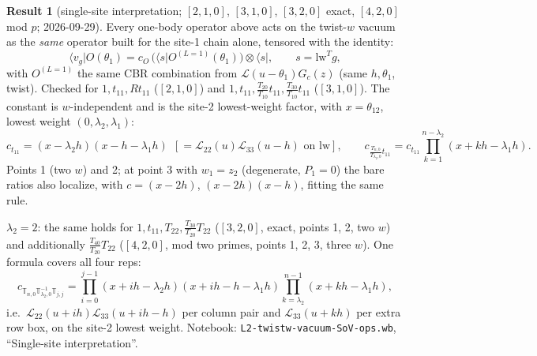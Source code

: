 \documentclass[11pt]{article}
\newcommand{\nb}[1]{\texttt{#1}}
\theoremstyle{definition}
\newtheorem{result}{Result}
\theoremstyle{remark}
\begin{document}
\begin{result}[{single-site interpretation; $[2,1,0]$, $[3,1,0]$, $[3,2,0]$ exact, $[4,2,0]$ mod $p$; 2026-09-29}]
Every one-body operator above acts on the twist-$w$ vacuum as the \emph{same} operator built for the site-1 chain alone, tensored with the identity:
\[
\langle v_g|O(\theta_1)=c_O\,\big(\langle s|O^{(L=1)}(\theta_1)\big)\otimes\langle s|,\qquad s=\mathrm{lw}^Tg,
\]
with $O^{(L=1)}$ the same CBR combination from $\mathcal L(u-\theta_1)G_c(z)$ (same $h,\theta_1$, twist). Checked for $1,t_{11},Rt_{11}$ ($[2,1,0]$) and $1,t_{11},\tfrac{T_{20}}{T_{10}}t_{11},\tfrac{T_{30}}{T_{10}}t_{11}$ ($[3,1,0]$). The constant is $w$-independent and is the site-2 lowest-weight factor, with $x=\theta_{12}$, lowest weight $(0,\lambda_2,\lambda_1)$:
\[
c_{t_{11}}=(x-\lambda_2h)(x-h-\lambda_1h)\ \ [=\mathcal L_{22}(u)\mathcal L_{33}(u-h)\text{ on lw}],\qquad
c_{\frac{T_{n,0}}{T_{\lambda_2,0}}t_{11}}=c_{t_{11}}\prod_{k=1}^{n-\lambda_2}(x+kh-\lambda_1h).
\]
Points 1 (two $w$) and 2; at point 3 with $w_1=z_2$ (degenerate, $P_1=0$) the bare ratios also localize, with $c=(x-2h)$, $(x-2h)(x-h)$, fitting the same rule.

$\lambda_2=2$: the same holds for $1,t_{11},T_{22},\tfrac{T_{30}}{T_{20}}T_{22}$ ($[3,2,0]$, exact, points 1, 2, two $w$) and additionally $\tfrac{T_{40}}{T_{20}}T_{22}$ ($[4,2,0]$, mod two primes, points 1, 2, 3, three $w$). One formula covers all four reps:
\[
c_{\mathbb T_{n,0}\mathbb T_{\lambda_2,0}^{-1}\mathbb T_{j,j}}=\prod_{i=0}^{j-1}(x+ih-\lambda_2h)(x+ih-h-\lambda_1h)\prod_{k=\lambda_2}^{n-1}(x+kh-\lambda_1h),
\]
i.e.\ $\mathcal L_{22}(u+ih)\mathcal L_{33}(u+ih-h)$ per column pair and $\mathcal L_{33}(u+kh)$ per extra row box, on the site-2 lowest weight. Notebook: \nb{L2-twistw-vacuum-SoV-ops.wb}, ``Single-site interpretation''.
\end{result}
\end{document}
